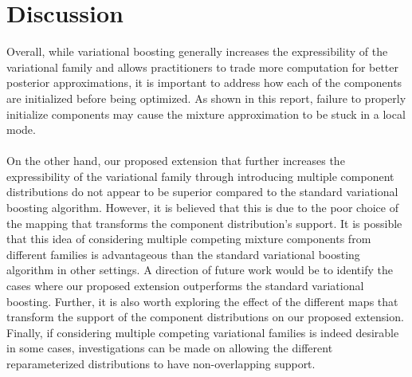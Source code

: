 

\section{Discussion}
Overall, while variational boosting generally increases the expressibility of the variational family and allows practitioners to trade more computation for better posterior approximations, it is important to address how each of the components are initialized before being optimized. As shown in this report, failure to properly initialize components may cause the mixture approximation to be stuck in a local mode.\\\\
On the other hand, our proposed extension that further increases the expressibility of the variational family through introducing multiple component distributions do not appear to be superior compared to the standard variational boosting algorithm. However, it is believed that this is due to the poor choice of the mapping that transforms the component distribution's support. It is possible that this idea of considering multiple competing mixture components from different families is advantageous than the standard variational boosting algorithm in other settings. A direction of future work would be to identify the cases where our proposed extension outperforms the standard variational boosting. Further, it is also worth exploring the effect of the different maps that transform the support of the component distributions on our proposed extension. Finally, if considering multiple competing variational families is indeed desirable in some cases, investigations can be made on allowing the different reparameterized distributions to have non-overlapping support.
